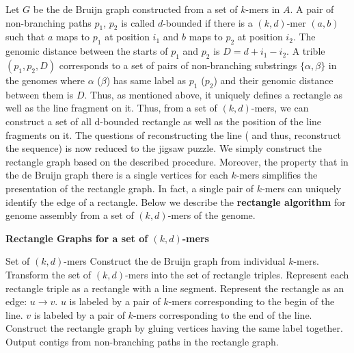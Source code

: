 \documentclass[a4paper]{article}
\begin{document}



Let $G$ be the de Bruijn graph constructed from a set of 
$k$-mers in $A$. A pair of non-branching paths $p_1$, $p_2$ is called $d$-bounded if there is a $(k,d)$-mer $(a,b)$ such that 
$a$ maps to $p_1$ at position $i_1$ and $b$ maps to $p_2$ at position $i_2$. The genomic distance between the starts 
of $p_1$ and $p_2$ is $D = d + i_1 - i_2$. A trible $(p_1, p_2, D)$ corresponds to a set of pairs of non-branching substrings 
$\{\alpha, \beta\}$ in the genomes where $\alpha$ ($\beta$) has same label as $p_1$ ($p_2$)  and their genomic distance between them 
is $D$. Thus, as mentioned above, it uniquely defines a rectangle as well as the line fragment on it. Thus, from a set of $(k,d)$-mers, 
 we can construct a set of all d-bounded rectangle as well as the position of the line fragments on it. 
The questions of reconstructing the line ( and thus, reconstruct the sequence) is now reduced to the jigsaw puzzle. We simply construct the 
rectangle graph based on the described procedure. Moreover, the property that in the de Bruijn graph there is a single vertices for each $k$-mers simplifies
the presentation of the rectangle graph. In fact, a single pair of $k$-mers can uniquely identify the edge of a rectangle. Below we describe 
the \textbf{rectangle algorithm} for genome assembly from a set of $(k,d)$-mers of the genome.   


\noindent
\textbf{Rectangle Graphs for a set of $(k,d)$-mers}
\bigskip
\begin{algorithmic}[1]
\REQUIRE Set of $(k,d)$-mers 
\STATE Construct the  de Bruijn graph from individual  $k$-mers.
\STATE Transform the set of $(k,d)$-mers into the set of rectangle triples. 
\STATE Represent each rectangle triple as a rectangle with a line segment.
\STATE Represent the rectangle as an edge: $u\rightarrow v$.
\STATE \hspace*{0.5cm} $u$ is labeled by a pair of $k$-mers corresponding to the begin of the line.
\STATE \hspace*{0.5cm} $v$ is labeled by a pair of $k$-mers corresponding to the end of the line.
\STATE Construct the rectangle graph by gluing vertices having the same label together.
\STATE Output contigs from non-branching paths in the rectangle graph.
\end{algorithmic}
\end{document}
